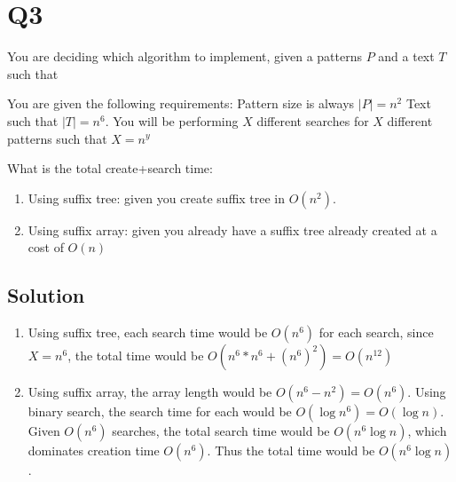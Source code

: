 
\section*{Q3}

You are deciding which algorithm to implement, given a patterns $P$ and a text $T$ such that

You are given the following requirements: Pattern size is always $|P|=n^2$ Text such that $|T|=n^6$.
You will be performing $X$ different searches for $X$ different patterns such that $X=n^y$

What is the total create+search time:

\begin{enumerate}
    \item Using suffix tree: given you create suffix tree in $O(n^2)$.
    \item Using suffix array: given you already have a suffix tree already created at a cost of $O(n)$
\end{enumerate}

\subsection*{Solution}

\begin{enumerate}
    \item Using suffix tree, each search time would be $O(n^6)$ for each search, since $X = n^6$, the total time would be $O(n^6 * n^6 + (n^6)^2) = O(n^{12})$
    \item Using suffix array, the array length would be $O(n^6 - n^2) = O(n^6)$.
          Using binary search, the search time for each would be $O(\log n^6) = O(\log n)$.
          Given $O(n^6)$ searches, the total search time would be $O(n^6 \log n)$, which dominates creation time $O(n^6)$.
          Thus the total time would be  $O(n^6 \log n)$.
\end{enumerate}
